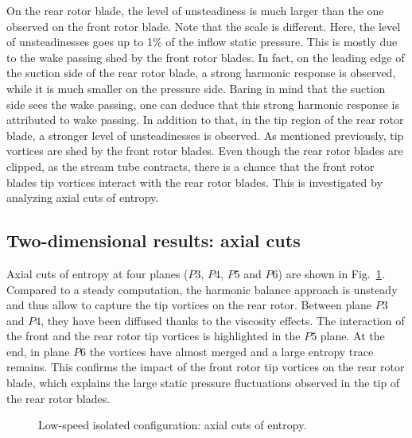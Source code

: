 On the rear rotor blade, the level
of unsteadiness is much larger than the one observed on
the front rotor blade. Note that the scale is different.
Here, the level of unsteadinesses
goes up to 1\% of the inflow static pressure.
This is mostly due to the wake passing
shed by the front rotor blades. In fact, on the leading
edge of the suction side of the rear rotor blade, 
a strong harmonic response is observed, while it is 
much smaller on the pressure side. Baring in mind that 
the suction side sees the wake passing, one can deduce
that this strong harmonic response is attributed to wake passing.
In addition to that, in the tip region of the rear rotor blade, 
a stronger level of unsteadinesses is observed. As mentioned
previously, tip vortices are shed by the front rotor blades.
Even though the rear rotor blades are clipped, as 
the stream tube contracts, there is a chance that
the front rotor blades tip vortices interact with the 
rear rotor blades. This is investigated by analyzing
axial cuts of entropy.

\subsection{Two-dimensional results: axial cuts}
\label{sub:dream_ls_hb_axial_cuts}

Axial cuts of entropy at four planes ($P3$, $P4$, $P5$ and $P6$)
are shown in Fig.~\ref{fig:dream_ls_hb_axial_cut_entropy}.
Compared to a steady computation, the harmonic balance
approach is unsteady and thus allow to capture the
tip vortices on the rear rotor. Between plane $P3$
and $P4$, they have been diffused thanks to the viscosity effects.
The interaction of the front and the rear rotor tip vortices
is highlighted in the $P5$ plane. At the end, in plane $P6$
the vortices have almost merged and a large entropy
trace remains. This confirms the impact
of the front rotor tip vortices on the
rear rotor blade, which explains the large static pressure
fluctuations observed in the tip of the rear 
rotor blades.
\begin{figure}[htp]
  \centering
  \caption{Low-speed isolated configuration: axial cuts of entropy.}
   \label{fig:dream_ls_hb_axial_cut_entropy}
\end{figure}

